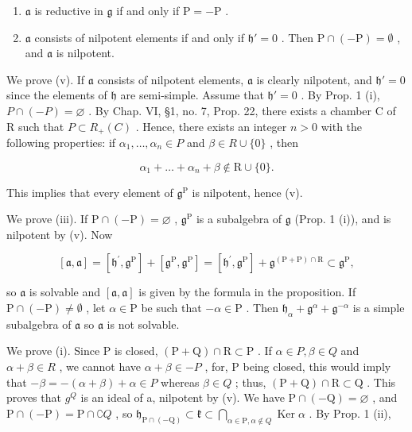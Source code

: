 \begin{enumerate}
\def\labelenumi{(\roman{enumi})}
\setcounter{enumi}{3}
\item
  \(\mathfrak{a}\) is reductive in \(\mathfrak{g}\) if and only if \(\mathrm{P} = -\mathrm{P}\) .
\item
  \(\mathfrak{a}\) consists of nilpotent elements if and only if \(\mathfrak{h}' = 0\) . Then \(\mathrm{P} \cap (-\mathrm{P}) = \emptyset\) , and \(\mathfrak{a}\) is nilpotent.
\end{enumerate}

We prove (v). If \(\mathfrak{a}\) consists of nilpotent elements, \(\mathfrak{a}\) is clearly nilpotent, and \(\mathfrak{h}' = 0\) since the elements of \(\mathfrak{h}\) are semi-simple. Assume that \(\mathfrak{h}' = 0\) . By Prop. 1 (i), \(P \cap (-P) = \varnothing\) . By Chap. VI, §1, no. 7, Prop. 22, there exists a chamber C of R such that \(P \subset R_{+}(C)\) . Hence, there exists an integer \(n > 0\) with the following properties: if \(\alpha_{1}, \ldots, \alpha_{n} \in P\) and \(\beta \in R \cup \{0\}\) , then

\[
\alpha_ {1} + \dots + \alpha_ {n} + \beta \notin \mathrm{R} \cup \{0 \}.
\]

This implies that every element of \(\mathfrak{g}^{\mathrm{P}}\) is nilpotent, hence (v).

We prove (iii). If \(\mathrm{P} \cap (-\mathrm{P}) = \varnothing\) , \(\mathfrak{g}^{\mathrm{P}}\) is a subalgebra of \(\mathfrak{g}\) (Prop. 1 (i)), and is nilpotent by (v). Now

\[
[ \mathfrak {a}, \mathfrak {a} ] = [ \mathfrak {h} ^ {\prime}, \mathfrak {g} ^ {\mathrm{P}} ] + [ \mathfrak {g} ^ {\mathrm{P}}, \mathfrak {g} ^ {\mathrm{P}} ] = [ \mathfrak {h} ^ {\prime}, \mathfrak {g} ^ {\mathrm{P}} ] + \mathfrak {g} ^ {(\mathrm{P} + \mathrm{P}) \cap \mathrm{R}} \subset \mathfrak {g} ^ {\mathrm{P}},
\]

so \(\mathfrak{a}\) is solvable and \([\mathfrak{a},\mathfrak{a}]\) is given by the formula in the proposition. If \(\mathrm{P}\cap (-\mathrm{P})\neq \emptyset\) , let \(\alpha \in \mathrm{P}\) be such that \(-\alpha \in \mathrm{P}\) . Then \(\mathfrak{h}_{\alpha} + \mathfrak{g}^{\alpha} + \mathfrak{g}^{-\alpha}\) is a simple subalgebra of \(\mathfrak{a}\) so \(\mathfrak{a}\) is not solvable.

We prove (i). Since P is closed, \((\mathrm{P} + \mathrm{Q}) \cap \mathrm{R} \subset \mathrm{P}\) . If \(\alpha \in P, \beta \in Q\) and \(\alpha + \beta \in R\) , we cannot have \(\alpha + \beta \in -P\) , for, P being closed, this would imply that \(-\beta = -(\alpha + \beta) + \alpha \in P\) whereas \(\beta \in Q\) ; thus, \((\mathrm{P} + \mathrm{Q}) \cap \mathrm{R} \subset \mathrm{Q}\) . This proves that \(g^{Q}\) is an ideal of a, nilpotent by (v). We have \(\mathrm{P} \cap (-\mathrm{Q}) = \varnothing\) , and \(\mathrm{P} \cap (-\mathrm{P}) = \mathrm{P} \cap \complement Q\) , so \(\mathfrak{h}_{\mathrm{P} \cap (-\mathrm{Q})} \subset \mathfrak{k} \subset \bigcap_{\alpha \in \mathrm{P}, \alpha \notin Q} \operatorname{Ker} \alpha\) . By Prop. 1 (ii),

